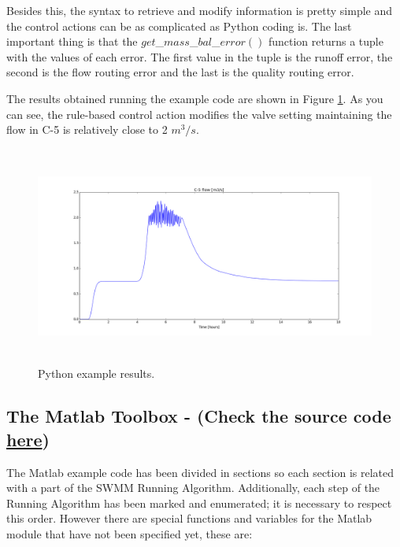 \documentclass[11pt, letterpaper]{article}
\begin{document}
Besides this, the syntax to retrieve and modify information is pretty simple and the control actions can be as complicated as Python coding is. The last important thing is that the $get$\_$mass$\_$bal$\_$error()$ function returns a tuple with the values of each error. The first value in the tuple is the runoff error, the second is the flow routing error and the last is the quality routing error. 

The results obtained running the example code are shown in Figure \ref{fig:python_ex}. As you can see, the rule-based control action modifies the valve setting maintaining the flow in C-5 is relatively close to 2 $m^3/s$.
\begin{figure}[ht!]
\begin{center}
\includegraphics[height=7.2cm]{figs/python_1}
\caption{Python example results.}
\label{fig:python_ex}
\end{center}
\end{figure}
\pagebreak

\subsection{The Matlab Toolbox - (Check the source code \textcolor{blue}{\href{https://bitbucket.org/swmmtoolbox001/matlab-module}{here}})}
\begin{center}
\begin{framed}

\end{framed}
\end{center}

\setlength\parindent{0pt}
The Matlab example code has been divided in sections so each section is related with a part of the SWMM Running Algorithm. Additionally, each step of the Running Algorithm has been marked and enumerated; it is necessary to respect this order. However there are special functions and variables for the Matlab module that have not been specified yet, these are:
\newline
\end{document}
